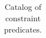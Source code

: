 \begin{table}[H]
{\begin{tabular}{|l|l|}





\end{tabular}
}
\caption{Catalog of {\UTP} constraint predicates.}
\label{tab:predicate_catalog}
\end{table}